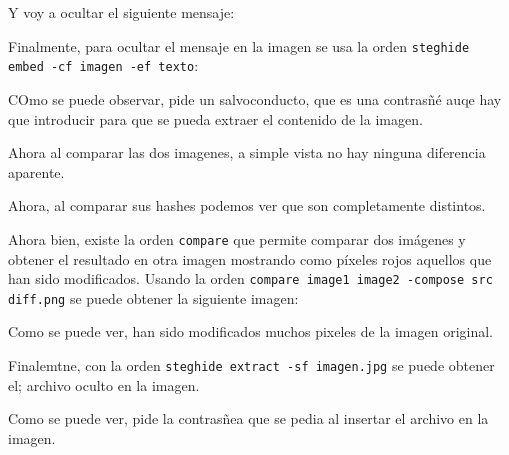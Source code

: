 \documentclass{article}
\begin{document}

Y voy a ocultar el siguiente mensaje:


Finalmente, para ocultar el mensaje en la imagen se usa la orden \verb|steghide embed -cf imagen -ef texto|:


COmo se puede observar, pide un salvoconducto, que es una contrasñé auqe hay que introducir para que se pueda extraer el contenido de la imagen.

Ahora al comparar las dos imagenes, a simple vista no hay ninguna diferencia aparente.


Ahora, al comparar sus hashes podemos ver que son completamente distintos.


Ahora bien, existe la orden \verb|compare| que permite comparar dos imágenes y obtener el resultado en otra imagen mostrando como píxeles rojos aquellos que han sido modificados. Usando la orden \verb|compare image1 image2 -compose src diff.png| se puede obtener la siguiente imagen:


Como se puede ver, han sido modificados muchos pixeles de la imagen original.

Finalemtne, con la orden \verb|steghide extract -sf imagen.jpg| se puede obtener el; archivo oculto en la imagen.


Como se puede ver, pide la contrasñea que se pedia al insertar el archivo en la imagen.
\end{document}
